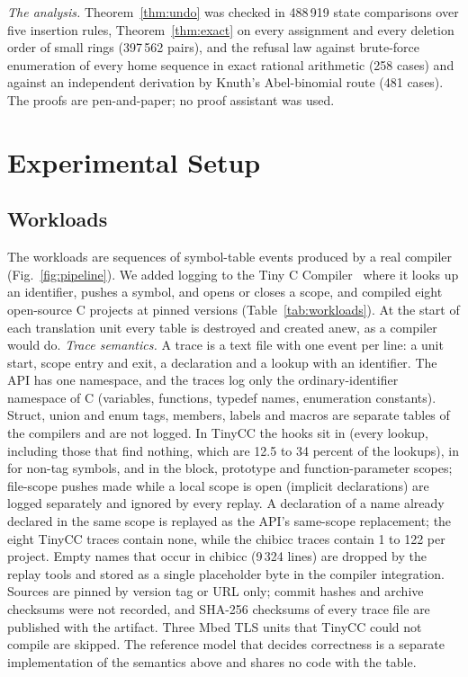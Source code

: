 \emph{The analysis.} Theorem~\ref{thm:undo} was checked in 488\,919 state comparisons over five insertion rules, Theorem~\ref{thm:exact} on every assignment and every deletion order of small rings (397\,562 pairs), and the refusal law against brute-force enumeration of every home sequence in exact rational arithmetic (258 cases) and against an independent derivation by Knuth's Abel-binomial route (481 cases). The proofs are pen-and-paper; no proof assistant was used.

\section{Experimental Setup}
\label{sec:setup}

\subsection{Workloads}

The workloads are sequences of symbol-table events produced by a real compiler (Fig.~\ref{fig:pipeline}). We added logging to the Tiny C Compiler~\cite{tcc} where it looks up an identifier, pushes a symbol, and opens or closes a scope, and compiled eight open-source C projects at pinned versions (Table~\ref{tab:workloads}). At the start of each translation unit every table is destroyed and created anew, as a compiler would do. \emph{Trace semantics.} A trace is a text file with one event per line: a unit start, scope entry and exit, a declaration and a lookup with an identifier. The API has one namespace, and the traces log only the ordinary-identifier namespace of C (variables, functions, typedef names, enumeration constants). Struct, union and enum tags, members, labels and macros are separate tables of the compilers and are not logged. In TinyCC the hooks sit in  (every lookup, including those that find nothing, which are 12.5 to 34 percent of the lookups), in  for non-tag symbols, and in the block, prototype and function-parameter scopes; file-scope pushes made while a local scope is open (implicit declarations) are logged separately and ignored by every replay. A declaration of a name already declared in the same scope is replayed as the API's same-scope replacement; the eight TinyCC traces contain none, while the chibicc traces contain 1 to 122 per project. Empty names that occur in chibicc (9\,324 lines) are dropped by the replay tools and stored as a single placeholder byte in the compiler integration. Sources are pinned by version tag or URL only; commit hashes and archive checksums were not recorded, and SHA-256 checksums of every trace file are published with the artifact. Three Mbed TLS units that TinyCC could not compile are skipped. The reference model that decides correctness is a separate implementation of the semantics above and shares no code with the table.

